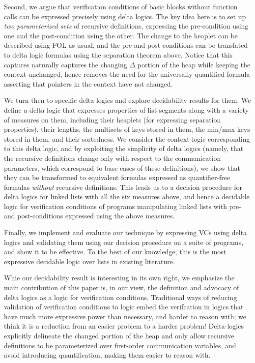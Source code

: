 Second, we argue that verification conditions of basic blocks without function calls can be expressed precisely using delta logics.
The key idea here is to set up \emph{two parameterized sets} of recursive definitions, expressing the pre-condition using
one and the post-condition using the other. The change to the heaplet can be described using FOL as usual, and the pre and post
conditions can be translated to delta logic formulas using the separation theorem above. Notice that this captures naturally
captures the changing $\Delta$ portion of the heap while keeping the context unchanged, 
hence removes the need for the universally quantified formula asserting that pointers in the context have not changed.

We turn then to specific delta logics and explore decidability results for them. We define a delta logic that expresses
properties of list segments along with a variety of measures on them, including their heaplets (for expressing separation properties), 
their lengths, the multisets of keys stored in them, the min/max keys stored in them, and their sortedness. We consider the context-logic
corresponding to this delta logic, and by exploiting the simplicity of delta logics (namely, that the recursive definitions change only
with respect to the communication parameters, which correspond to base cases of these definitions), we show that they
can be transformed to equivalent formulas expressed as quantifier-free formulas \emph{without} recursive definitions. This
leads us to a decision procedure for delta logics for linked lists with all the six measures above, and hence a decidable logic
for verification conditions of programs manipulating linked lists with pre- and post-conditions expressed using the above measures.

Finally, we implement and evaluate our technique by expressing VCs using delta logics and validating them using our decision procedure
on a suite of programs, and show it to be effective. 
To the best of our knowledge, this is the most expressive decidable logic over lists in existing literature. 

Whie our decidability result is interesting in its own right, we emphasize the main contribution of this paper is, in our view, 
the definition and advocacy of delta logics as a logic for verification conditions. 
Traditional ways of reducing validation of verification conditions to logic embed the verifcation in logics that have much
more expressive power than necessary, and harder to reason with; we think it is a reduction from an easier problem to a harder problem!
Delta-logics explicitly delineate the changed portion of the heap and only allow recursive definitions to be parameterized over 
first-order communication variables, and avoid introducing quantification, making them easier to reason with.

